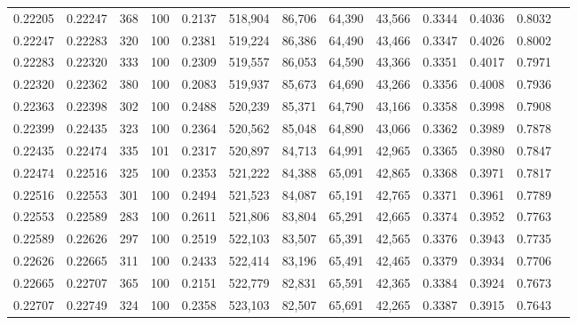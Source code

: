 \begin{tabular}{rrrrrrrrrrrrr}
0.22205 & 0.22247 &   368 & 100 &                                     0.2137 & 518,904 &  86,706 &  64,390 &  43,566 & 0.3344 & 0.4036 & 0.8032 \\
0.22247 & 0.22283 &   320 & 100 &                                     0.2381 & 519,224 &  86,386 &  64,490 &  43,466 & 0.3347 & 0.4026 & 0.8002 \\
0.22283 & 0.22320 &   333 & 100 &                                     0.2309 & 519,557 &  86,053 &  64,590 &  43,366 & 0.3351 & 0.4017 & 0.7971 \\
0.22320 & 0.22362 &   380 & 100 &                                     0.2083 & 519,937 &  85,673 &  64,690 &  43,266 & 0.3356 & 0.4008 & 0.7936 \\
0.22363 & 0.22398 &   302 & 100 &                                     0.2488 & 520,239 &  85,371 &  64,790 &  43,166 & 0.3358 & 0.3998 & 0.7908 \\
0.22399 & 0.22435 &   323 & 100 &                                     0.2364 & 520,562 &  85,048 &  64,890 &  43,066 & 0.3362 & 0.3989 & 0.7878 \\
0.22435 & 0.22474 &   335 & 101 &                                     0.2317 & 520,897 &  84,713 &  64,991 &  42,965 & 0.3365 & 0.3980 & 0.7847 \\
0.22474 & 0.22516 &   325 & 100 &                                     0.2353 & 521,222 &  84,388 &  65,091 &  42,865 & 0.3368 & 0.3971 & 0.7817 \\
0.22516 & 0.22553 &   301 & 100 &                                     0.2494 & 521,523 &  84,087 &  65,191 &  42,765 & 0.3371 & 0.3961 & 0.7789 \\
0.22553 & 0.22589 &   283 & 100 &                                     0.2611 & 521,806 &  83,804 &  65,291 &  42,665 & 0.3374 & 0.3952 & 0.7763 \\
0.22589 & 0.22626 &   297 & 100 &                                     0.2519 & 522,103 &  83,507 &  65,391 &  42,565 & 0.3376 & 0.3943 & 0.7735 \\
0.22626 & 0.22665 &   311 & 100 &                                     0.2433 & 522,414 &  83,196 &  65,491 &  42,465 & 0.3379 & 0.3934 & 0.7706 \\
0.22665 & 0.22707 &   365 & 100 &                                     0.2151 & 522,779 &  82,831 &  65,591 &  42,365 & 0.3384 & 0.3924 & 0.7673 \\
0.22707 & 0.22749 &   324 & 100 &                                     0.2358 & 523,103 &  82,507 &  65,691 &  42,265 & 0.3387 & 0.3915 & 0.7643 \\

\end{tabular}
